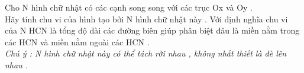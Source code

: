 Cho N hình chữ nhật có các cạnh song song với các trục Ox và Oy .   
\\   Hãy tính chu vi của hình tạo bởi N hình chữ nhật này . Với định nghĩa chu vi của N HCN là tổng độ dài các đường biên giúp phân biệt đâu là miền nằm trong các HCN và miền nằm ngoài các HCN .   
\\\textit{    Chú ý : N hình chữ nhật này có thể tách rời nhau , không nhất thiết là đè lên nhau .   }